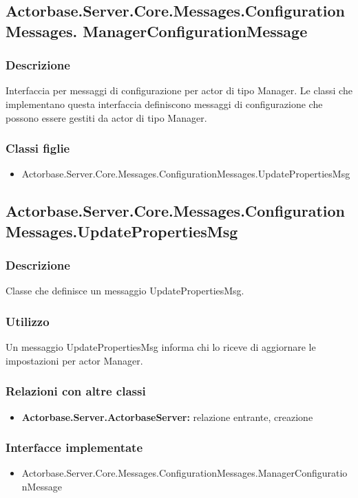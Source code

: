 \documentclass[a4paper]{article}
\begin{document}
			\subsection{Actorbase.Server.Core.Messages.ConfigurationMessages.
			ManagerConfigurationMessage}
			\subsubsection{Descrizione}
				Interfaccia per messaggi di configurazione per actor di tipo Manager. 
				Le classi che implementano questa interfaccia definiscono messaggi di configurazione che possono essere gestiti da actor di tipo Manager.
			\subsubsection{Classi figlie}
			\begin{itemize}
				\item Actorbase.Server.Core.Messages.ConfigurationMessages.UpdatePropertiesMsg
			\end{itemize}

			\subsection{Actorbase.Server.Core.Messages.ConfigurationMessages.UpdatePropertiesMsg}
			\subsubsection{Descrizione}
				Classe che definisce un messaggio UpdatePropertiesMsg.
			\subsubsection{Utilizzo}
				Un messaggio UpdatePropertiesMsg informa chi lo riceve di aggiornare le impostazioni per actor Manager.
			\subsubsection{Relazioni con altre classi}
			\begin{itemize}
				\item \textbf{Actorbase.Server.ActorbaseServer:} relazione entrante, creazione
			\end{itemize}
			\subsubsection{Interfacce implementate}
			\begin{itemize}
				\item Actorbase.Server.Core.Messages.ConfigurationMessages.ManagerConfigurationMessage
			\end{itemize}
\end{document}

